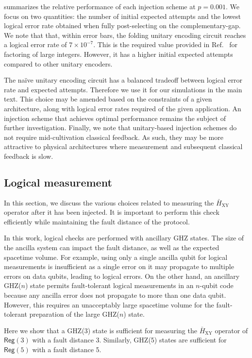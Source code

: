 \documentclass[%
    aps, 
    physrev,
    reprint,
]{revtex4-2}
\newcommand{\reg}[1]{\mathsf{Reg}(#1)}
\newcommand{\XY}{_\mathrm{XY}}
\begin{document}
{ summarizes the relative performance of each injection scheme at $p = 0.001$.}
We focus on two quantities: the number of initial expected attempts and the lowest logical error rate obtained when fully post-selecting on the complementary-gap.
We note that that, within error bars, the folding unitary encoding circuit reaches a logical error rate of $7 \times 10^{-7}$.
This is the required value provided in Ref.~\cite{zhou_resource_2025} for factoring of large integers. 
However, it has a higher initial expected attempts compared to other unitary encoders.

The na{\"ive} unitary encoding circuit has a balanced tradeoff between logical error rate and expected attempts. 
Therefore we use it for our simulations in the main text.
This choice may be amended based on the constraints of a given architecture, along with logical error rates required of the given application.
An injection scheme that achieves optimal performance remains the subject of further investigation.
Finally, we note that unitary-based injection schemes do not require mid-cultivation classical feedback.
As such, they may be more attractive to physical architectures where measurement and subsequent classical feedback is slow.


\subsection{Logical measurement}\label{app:logical-h-msmt}

In this section, we discuss the various choices related to measuring the $\bar{H}\XY$ operator after it has been injected.
It is important to perform this check efficiently while maintaining the fault distance of the protocol.

In this work, logical checks are performed with ancillary GHZ states. 
The size of the ancilla system
can impact the fault distance,
as well as the expected spacetime volume. 
For example, using only a single ancilla qubit for logical measurements is insufficient as a single error on it may propagate to multiple errors on data qubits, leading to logical errors. 
On the other hand, an ancillary GHZ($n$) state permits fault-tolerant logical measurements in an $n$-qubit code because any ancilla error does not propagate to more than one data qubit. 
However, this requires an unacceptably large spacetime volume for the fault-tolerant preparation of the large GHZ($n$) state.

Here we show that a GHZ(3) state is sufficient for measuring the $\bar{H}\XY$ operator of $\reg3$ with a fault distance 3. 
Similarly, GHZ(5) states are sufficient for $\reg{5}$ with a fault distance 5. 
\end{document}
